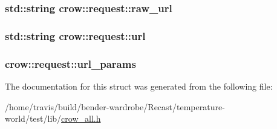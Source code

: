 \hypertarget{structcrow_1_1request_a72f5504a56f9ba70d7d33f86aaf9bc8a}{
\subsubsection[{raw\-\_\-url}]{\setlength{\rightskip}{0pt plus 5cm}std\-::string crow\-::request\-::raw\-\_\-url}}\label{structcrow_1_1request_a72f5504a56f9ba70d7d33f86aaf9bc8a}
\hypertarget{structcrow_1_1request_aa3df34c56847d6d42887e73655276167}{
\subsubsection[{url}]{\setlength{\rightskip}{0pt plus 5cm}std\-::string crow\-::request\-::url}}\label{structcrow_1_1request_aa3df34c56847d6d42887e73655276167}
\hypertarget{structcrow_1_1request_a745d5a94e9e9ae1fed64674aae0194b0}{
\subsubsection[{url\-\_\-params}]{ crow\-::request\-::url\-\_\-params}}\label{structcrow_1_1request_a745d5a94e9e9ae1fed64674aae0194b0}


The documentation for this struct was generated from the following file\-:\begin{DoxyCompactItemize}
\item 
/home/travis/build/bender-\/wardrobe/\-Recast/temperature-\/world/test/lib/\hyperlink{crow__all_8h}{crow\-\_\-all.\-h}\end{DoxyCompactItemize}
